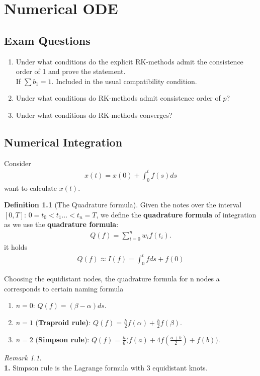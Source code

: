 \documentclass[a4paper,12pt,oneside,fleqn]{book}
\theoremstyle{definition}
\newtheorem{definition}{Definition}[section]
\theoremstyle{remark}
\newtheorem*{remark}{Remark}
\begin{document}
\chapter{Numerical ODE}

\section{Exam Questions}
\begin{enumerate}
	\item Under what conditions do the explicit RK-methods admit the consistence order of 1 and prove the statement.\\
	If $ \sum b_1 = 1$. Included in the usual compatibility condition.
	\item Under what conditions do RK-methods admit consistence order of $p$?
	\item Under what conditions do RK-methods converges?
\end{enumerate}

\section{Numerical Integration}
Consider 
\begin{align*}
	x(t) = x(0) + \int_0^t f(s) ds
\end{align*}
want to calculate $x(t)$.

\begin{definition}[The Quadrature formula]
Given the notes over the interval $[0, T]$: $0 = t_0 < t_1 \dots < t_n = T$, we define the \textbf{quadrature formula} of integration as 
 we use the \textbf{quadrature formula}:
\begin{align*}
	Q(f) = \sum_{ i = 0}^n w_i f(t_i).
\end{align*}
it holds
\begin{align*}
	Q(f) \approx I(f) = \int_0^t f ds + f(0)
\end{align*}
\end{definition}
Choosing the equidistant nodes, the quadrature formula for n nodes a corresponds to certain naming formula
\begin{enumerate}
	\item $n = 0$: $Q(f) =  (\beta - \alpha) ds$. 
	\item $n = 1$ (\textbf{Traproid rule)}:  $Q(f) = \frac{h}{2}f(\alpha) + \frac{h}{2} f(\beta)$.  
	\item $n = 2$ (\textbf{Simpson rule}): $Q(f) = \frac{h}{6}\bigg( f(a) + 4 f(\frac{a + b}{2}) + f(b) \bigg).$
\end{enumerate}
\begin{remark}
\qquad\\
\textbf{1.} Simpson rule is the Lagrange formula with 3 equidistant knots. 
\end{remark}
\end{document}
